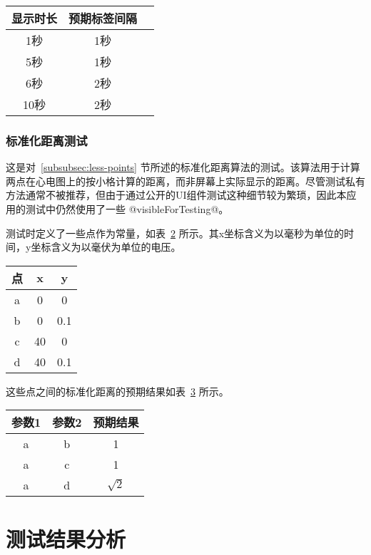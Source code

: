 \begin{table}[!ht]
    \centering
    \label{tab:label-interval}
    \begin{tabular}{|c|c|c|}
        \hline
        显示时长 & 预期标签间隔 \\
        \hline
        1秒   & 1秒     \\
        \hline
        5秒   & 1秒     \\
        \hline
        6秒   & 2秒     \\
        \hline
        10秒  & 2秒     \\
        \hline
    \end{tabular}
\end{table}

\subsubsection{标准化距离测试}

这是对~\ref{subsubsec:less-points} 节所述的标准化距离算法的测试。该算法用于计算两点在心电图上的按小格计算的距离，而非屏幕上实际显示的距离。尽管测试私有方法通常不被推荐，但由于通过公开的UI组件测试这种细节较为繁琐，因此本应用的测试中仍然使用了一些 @visibleForTesting@。

测试时定义了一些点作为常量，如表~\ref{tab:spots} 所示。其x坐标含义为以毫秒为单位的时间，y坐标含义为以毫伏为单位的电压。

\begin{table}[!ht]
    \centering
    \label{tab:spots}
    \begin{tabular}{|c|c|c|}
        \hline
        点 & x  & y   \\
        \hline
        a & 0  & 0   \\
        \hline
        b & 0  & 0.1 \\
        \hline
        c & 40 & 0   \\
        \hline
        d & 40 & 0.1 \\
        \hline
    \end{tabular}
\end{table}

这些点之间的标准化距离的预期结果如表~\ref{tab:expected-distance} 所示。

\begin{table}[!ht]
    \centering
    \label{tab:expected-distance}
    \begin{tabular}{|c|c|c|}
        \hline
        参数1 & 参数2 & 预期结果         \\
        \hline
        a   & b   & 1            \\
        \hline
        a   & c   & 1            \\
        \hline
        a   & d   & \(\sqrt{2}\) \\
        \hline
    \end{tabular}
\end{table}


\section{测试结果分析}\label{sec:test-result}

